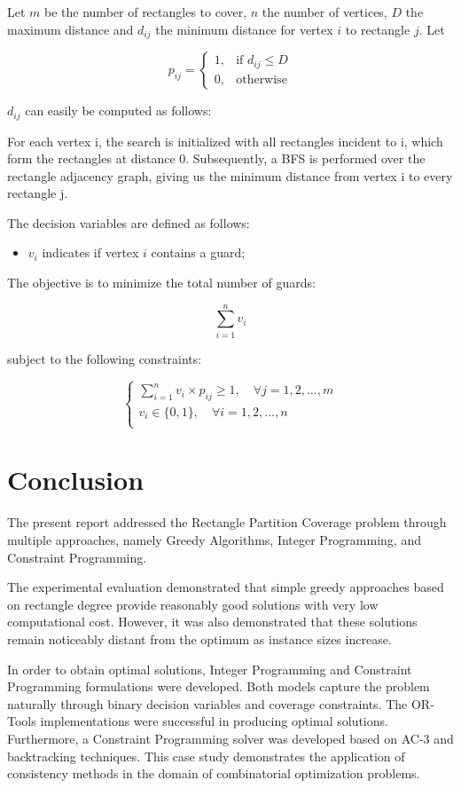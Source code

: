 \documentclass{report}
\begin{document}
Let $m$ be the number of rectangles to cover, $n$ the number of vertices, $D$ the maximum distance and $d_{ij}$ the minimum distance for vertex $i$ to rectangle $j$. Let

$$
p_{ij} =
\begin{cases}
  1, & \text{if } d_{ij} \le D\\
0, & \text{otherwise}
\end{cases}
$$

$d_{ij}$ can easily be computed as follows: 

For each vertex i, the search is initialized with all rectangles incident to i, which form the rectangles at distance 0. Subsequently, a BFS is performed over the rectangle adjacency graph, giving us the minimum distance from vertex i to every rectangle j.

The decision variables are defined as follows:

\begin{itemize}
    \item $v_i$ indicates if vertex $i$ contains a guard;
\end{itemize}

The objective is to minimize the total number of guards:

\[\sum_{i = 1}^{n} v_{i}\]

subject to the following constraints:

\[
\begin{cases}
	\sum_{i = 1}^{n} v_{i} \times p_{ij} \ge 1, \quad \forall j = 1,2,\dots,m \\
	v_{i} \in \{0,1\}, \quad \forall i = 1,2,\dots,n                          \\
\end{cases}
\]


\chapter{Conclusion}

The present report addressed the Rectangle Partition Coverage problem through multiple approaches, namely Greedy Algorithms, Integer Programming, and Constraint Programming. 

The experimental evaluation demonstrated that simple greedy approaches based on rectangle degree provide reasonably good solutions with very low computational cost. However, it was also demonstrated that these solutions remain noticeably distant from the optimum as instance sizes increase.

In order to obtain optimal solutions, Integer Programming and Constraint Programming formulations were developed. Both models capture the problem naturally through binary decision variables and coverage constraints. The OR-Tools implementations were successful in producing optimal solutions. Furthermore, a Constraint Programming solver was developed based on AC-3 and backtracking techniques. This case study demonstrates the application of consistency methods in the domain of combinatorial optimization problems. 
\end{document}
